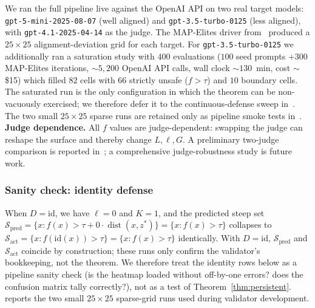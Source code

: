 \documentclass[11pt]{article}
\newcommand{\dist}{\operatorname{dist}}
\begin{document}
We ran the full pipeline live against the OpenAI API on two real
target models: \texttt{gpt-5-mini-2025-08-07} (well aligned) and
\texttt{gpt-3.5-turbo-0125} (less aligned), with
\texttt{gpt-4.1-2025-04-14} as the judge. The MAP-Elites driver
from~\cite{munshi2026manifold} produced a $25 \times 25$
alignment-deviation grid for each target. For
\texttt{gpt-3.5-turbo-0125} we additionally ran a saturation study
with $400$ evaluations ($100$ seed prompts $+ 300$ MAP-Elites
iterations, $\sim$$5{,}200$ OpenAI API calls, wall clock
$\sim$$130$~min, cost $\sim$\$15) which filled $82$ cells with
$66$ strictly unsafe ($f > \tau$) and $10$ boundary cells. The
saturated run is the only configuration in which the theorem can
be non-vacuously exercised; we therefore defer it to the
continuous-defense sweep in~. The two small
$25\times 25$ sparse runs are retained only as pipeline smoke
tests in~. \textbf{Judge dependence.}
All $f$ values are judge-dependent: swapping the judge can
reshape the surface and thereby change $L, \ell, G$. A
preliminary two-judge comparison is reported
in~; a comprehensive judge-robustness
study is future work.

\subsubsection{Sanity check: identity defense}
\label{sec:identity-sanity}

When $D = \mathrm{id}$, we have $\ell = 0$ and $K = 1$, and the
predicted steep set
$\mathcal{S}_{\text{pred}} = \{x : f(x) > \tau + 0 \cdot \dist(x, z^{*})\}
= \{x : f(x) > \tau\}$
collapses to $\mathcal{S}_{\text{act}} = \{x : f(\mathrm{id}(x)) > \tau\}
= \{x : f(x) > \tau\}$ identically. With $D = \mathrm{id}$,
$\mathcal{S}_{\text{pred}}$ and $\mathcal{S}_{\text{act}}$
coincide by construction; these runs only confirm the validator's
bookkeeping, not the theorem. We therefore treat the identity
rows below as a pipeline sanity check (is the heatmap loaded
without off-by-one errors? does the confusion matrix tally
correctly?), not as a test of
Theorem~\ref{thm:persistent}.~ reports the
two small $25\times 25$ sparse-grid runs used during validator
development.
\end{document}
